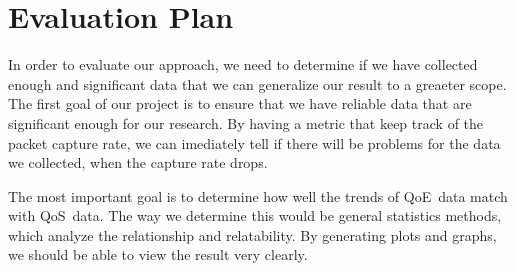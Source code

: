 \section{Evaluation Plan}\label{evaluation}
    In order to evaluate our approach, we need to determine if we have collected enough and significant data that we can generalize our result to a greaeter scope. The first goal of our project is to ensure that we have reliable data that are significant enough for our research. By having a metric that keep track of the packet capture rate, we can imediately tell if there will be problems for the data we collected, when the capture rate drops.

    The most important goal is to determine how well the trends of QoE~data match with QoS~data. The way we determine this would be general statistics methods, which analyze the relationship and relatability. By generating plots and graphs, we should be able to view the result very clearly.
